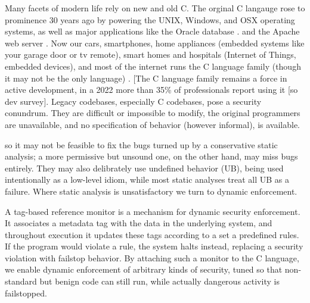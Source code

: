 \documentclass[acmsmall,review,anonymous]{acmart}\settopmatter{printfolios=true,printccs=false,printacmref=false}
\begin{document}
Many facets of modern life rely on new and old C. The orginal C langauge rose to prominence 30 years ago by powering
the UNIX, Windows, and OSX operating systems,  as well as major applications like the Oracle database \cite{Munoz:PoweredbyC} . 
and the Apache web server \cite{apache97:main-site}. Now our cars, smartphones, 
home appliances (embedded systems like your garage door or tv remote), smart homes and hospitals (Internet of Things, embedded devices), 
and most of the internet runs the C language family (though it may not be the only language) \cite{Munoz:PoweredbyC}. 
[The C language family remains a force in active development, in a 2022 more 
than 35\% of professionals report using it [so dev survey].
Legacy codebases, especially C codebases, pose a security conundrum. 
They are difficult or impossible to
modify, the original programmers are unavailable, and no specification of behavior (however informal), is available.


so it may not be feasible to fix the bugs
turned up by a conservative static analysis; a more permissive but unsound one, on the other hand,
may miss bugs entirely. They may also delibrately use undefined behavior (UB), being used intentionally
as a low-level idiom, while most static analyses treat all UB as a failure. Where static analysis
is unsatisfactory we turn to dynamic enforcement.

A tag-based reference monitor is a mechanism for dynamic security enforcement. It associates
a metadata tag with the data in the underlying system, and throughout execution it updates these
tags according to a set a predefined rules. If the program would violate a rule, the system halts
instead, replacing a security violation with failstop behavior. By attaching such a monitor to
the C language, we enable dynamic enforcement of arbitrary kinds of security, tuned so that
non-standard but benign code can still run, while actually dangerous activity is failstopped.
\end{document}
